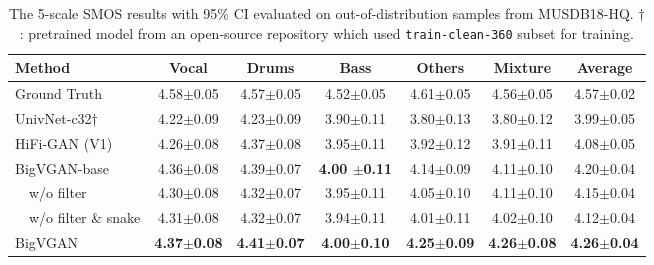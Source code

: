 \documentclass{article} \usepackage{iclr2023_conference,times}
\theoremstyle{plain}
\theoremstyle{definition}
\theoremstyle{remark}
\begin{document}
\begin{table*}[t]
\vspace{-.2cm}
\caption{\footnotesize 
The 5-scale SMOS results with 95\% CI evaluated on out-of-distribution samples from MUSDB18-HQ. $\dagger$: pretrained model from an open-source repository which used \texttt{train-clean-360} subset for training.}
\label{tab:musdb-hq}
\begin{center}
\begin{small}
\begin{tabular}{lccccc|c}
\toprule
Method & Vocal & Drums & Bass & Others & Mixture & Average \\
\midrule
Ground Truth & 4.58$\pm$0.05 & 4.57$\pm$0.05 & 4.52$\pm$0.05 & 4.61$\pm$0.05 & 4.56$\pm$0.05 &  4.57$\pm$0.02 \\
\midrule
UnivNet-c32$\dagger$ & 4.22$\pm$0.09 & 4.23$\pm$0.09 & 3.90$\pm$0.11 & 3.80$\pm$0.13 & 3.80$\pm$0.12 & 3.99$\pm$0.05 \\
HiFi-GAN (V1) & 4.26$\pm$0.08 & 4.37$\pm$0.08 & 3.95$\pm$0.11 & 3.92$\pm$0.12 & 3.91$\pm$0.11 & 4.08$\pm$0.05 \\
\midrule
BigVGAN-base & 4.36$\pm$0.08 & 4.39$\pm$0.07 & \textbf{4.00 $\pm$0.11} & 4.14$\pm$0.09 & 4.11$\pm$0.10 & 4.20$\pm$0.04 \\
\ \ w/o filter & 4.30$\pm$0.08 & 4.32$\pm$0.07 & 3.95$\pm$0.11 & 4.05$\pm$0.10 & 4.11$\pm$0.10 & 4.15$\pm$0.04 \\
\ \ w/o filter \& snake & 4.31$\pm$0.08 & 4.32$\pm$0.07 & 3.94$\pm$0.11 & 4.01$\pm$0.11 & 4.02$\pm$0.10 & 4.12$\pm$0.04 \\
\midrule
BigVGAN & \textbf{4.37$\pm$0.08} & \textbf{4.41$\pm$0.07} & \textbf{4.00$\pm$0.10} & \textbf{4.25$\pm$0.09} & \textbf{4.26$\pm$0.08} & \textbf{4.26$\pm$0.04} \\
\bottomrule
\end{tabular}
\end{small}
\end{center}
\vskip -0.1in
\end{table*}


\vspace{-.2cm}
\end{document}
